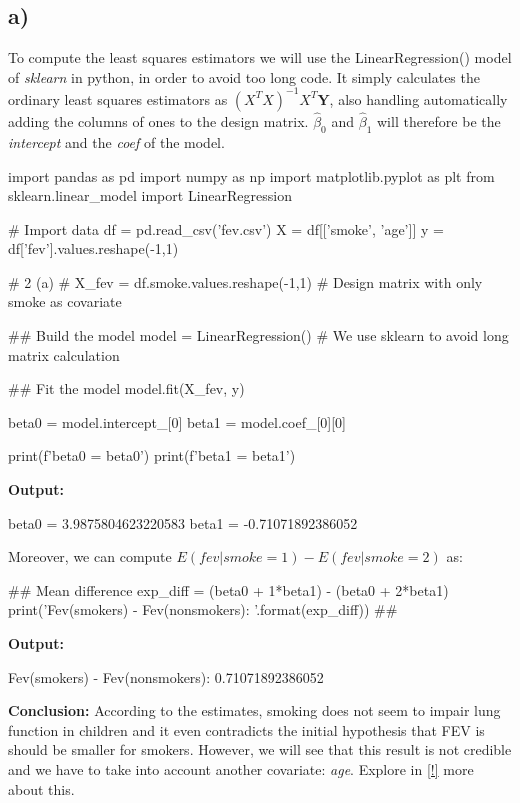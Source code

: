\documentclass[a4paper]{article}
\begin{document}
\subsection*{a)}
To compute the least squares estimators we will use the LinearRegression() model of \textit{sklearn} in python, in order to avoid too long code. It simply calculates the ordinary least squares estimators as $(X^{T}X)^{-1}X^{T}\textbf{Y}$, also handling automatically adding the columns of ones to the design matrix. $\hat{\beta}_0$ and $\hat{\beta}_1$ will therefore be the \textit{intercept} and the \textit{coef} of the model.
\begin{python}
	import pandas as pd
	import numpy as np
	import matplotlib.pyplot as plt
	from sklearn.linear_model import LinearRegression
	
	# Import data
	df = pd.read_csv('fev.csv')
	X = df[['smoke', 'age']]
	y = df['fev'].values.reshape(-1,1)
	
	# 2 (a) #
	X_fev = df.smoke.values.reshape(-1,1) # Design matrix with only smoke as covariate
	
	## Build the model
	model = LinearRegression() # We use sklearn to avoid long matrix calculation
	
	## Fit the model
	model.fit(X_fev, y)
	
	beta0 = model.intercept_[0]
	beta1 = model.coef_[0][0]
	
	print(f'beta0 = {beta0}')
	print(f'beta1 = {beta1}')
\end{python}
\textbf{Output:}
\begin{python}
	beta0 = 3.9875804623220583
	beta1 = -0.71071892386052
\end{python}
Moreover, we can compute $E(fev|smoke=1)-E(fev|smoke=2)$ as:
\begin{python}
	## Mean difference
	exp_diff = (beta0 + 1*beta1) - (beta0 + 2*beta1)
	print('Fev(smokers) - Fev(nonsmokers): {}'.format(exp_diff))
	##
\end{python}
\textbf{Output:}
\begin{python}
	Fev(smokers) - Fev(nonsmokers): 0.71071892386052
\end{python}
\textbf{Conclusion:}
According to the estimates, smoking does not seem to impair lung function in children and it even contradicts the initial hypothesis that FEV is should be smaller for smokers. However, we will see that this result is not credible and we have to take into account another covariate: \textit{age}. Explore in \ref{!} more about this.
\end{document}
